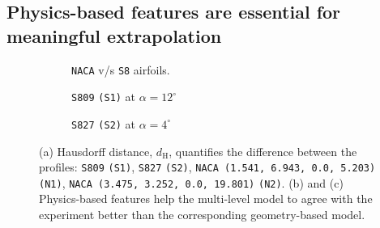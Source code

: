 \documentclass{marine_2025_paper_template}
\begin{document}
\subsection{Physics-based features are essential for meaningful extrapolation}

\begin{figure}[t]
    \centering
    \hspace{-0.25cm}
    \begin{subfigure}{.23\textwidth}
        \centering
        \raisebox{0.3cm}{}
        \vspace{-0.1cm}
        \hspace{-0.5cm}
        \begin{subfigure}{1.8\textwidth}
            \centering
            \vspace{-0.3cm}
            
            \label{fig:hausdorff_matrix}
        \end{subfigure}
        \caption{\texttt{NACA} v/s \texttt{S8} airfoils.}
        \label{fig:extrapolation_geometries_distance}
    \end{subfigure}
    \hspace{1.35cm}
    \begin{subfigure}{.35\textwidth}
        \centering
        \raisebox{0cm}{}
        \caption{\texttt{S809} {\texttt{(S1)}} at $\alpha=12^{\circ}$}
        \label{fig:s809_extrapolation}
    \end{subfigure}
    \hspace{-0.45cm}
    \begin{subfigure}{0.35\textwidth}
            \centering
            \raisebox{0.0cm}{}
            \caption{\texttt{S827} {\texttt{(S2)}} at $\alpha=4^{\circ}$}
            \label{fig:s827_extrapolation}
        \end{subfigure}
    \vspace{-0.2cm}
    \caption{ (a) Hausdorff distance, $d_{\mathrm{H}}$, quantifies the difference between the profiles: \texttt{S809} {\texttt{(S1)}}, \texttt{S827} {\texttt{(S2)}}, \texttt{NACA (1.541, 6.943, 0.0, 5.203)} {\texttt{(N1)}}, \texttt{NACA (3.475, 3.252, 0.0, 19.801)} {\texttt{(N2)}}. (b) and (c) Physics-based features help the multi-level model to agree with the experiment better than the corresponding geometry-based model.}
    \label{fig:pbf_helps_in_extrapolation}
\end{figure}
\end{document}

